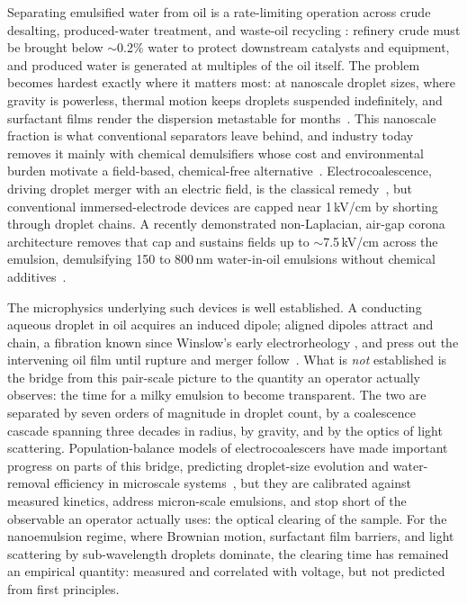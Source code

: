 \documentclass[aps,prfluids,reprint,amsmath,amssymb,superscriptaddress,longbibliography]{revtex4-2}
\begin{document}
Separating emulsified water from oil is a rate-limiting operation across crude
desalting, produced-water treatment, and waste-oil recycling
\cite{kokal2005,zolfaghari2016}: refinery crude must be brought below
$\sim$0.2\% water to protect downstream catalysts and equipment, and
produced water is generated at multiples of the oil itself. The problem
becomes hardest exactly where it matters most: at nanoscale droplet sizes,
where gravity is powerless, thermal motion keeps droplets suspended
indefinitely, and surfactant films render the dispersion metastable for
months~\cite{eow2001,tadros2009,mason2006,gupta2016}. This nanoscale
fraction is what conventional separators leave behind, and industry today
removes it mainly with chemical demulsifiers whose cost and environmental
burden motivate a field-based, chemical-free
alternative~\cite{zolfaghari2016,panat2025}. Electrocoalescence,
driving droplet merger with an electric field, is the classical
remedy~\cite{atten1993,eow2001,mhatre2015,less2012}, but
conventional immersed-electrode devices are capped near 1\,kV/cm by
shorting through droplet chains. A recently demonstrated non-Laplacian,
air-gap corona architecture removes that cap and sustains fields up to
$\sim$7.5\,kV/cm across the emulsion, demulsifying 150 to 800\,nm water-in-oil
emulsions without chemical additives~\cite{panat2025}.

The microphysics underlying such devices is well established. A conducting
aqueous droplet in oil acquires an induced dipole; aligned dipoles attract
and chain, a fibration known since Winslow's early electrorheology
\cite{winslow1949,parthasarathy1996}, and press out the intervening oil
film until rupture and merger follow~\cite{atten1993,zhang1995,jones1995,
lathamroxburgh1966}. What is \emph{not} established is
the bridge from this pair-scale picture to the quantity an operator actually
observes: the time for a milky emulsion to become transparent. The two are
separated by seven orders of magnitude in droplet count, by a coalescence
cascade spanning three decades in radius, by gravity, and by the optics of
light scattering. Population-balance models of electrocoalescers have made
important progress on parts of this bridge, predicting droplet-size
evolution and water-removal efficiency in microscale
systems~\cite{sharma2023,anand2019,su2023,rahmani2023,khajeh2020}, but they
are calibrated against measured kinetics, address micron-scale emulsions,
and stop short of the observable an operator actually uses: the optical
clearing of the sample. For the nanoemulsion regime, where Brownian motion,
surfactant film barriers, and light scattering by sub-wavelength droplets
dominate, the clearing time has remained an empirical quantity: measured
and correlated with voltage, but not predicted from first principles.
\end{document}
